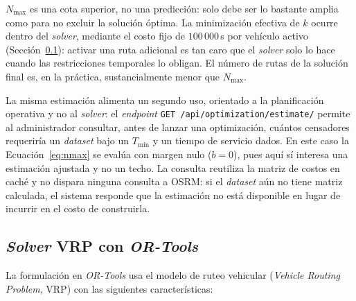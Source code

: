 $N_{\max}$ es una cota superior, no una
predicción: solo debe ser lo bastante amplia como para no excluir la solución óptima.
La minimización efectiva de $k$ ocurre dentro del \textit{solver}, mediante el costo fijo de
$100\,000$\,s por vehículo activo (Sección~\ref{sec:solver}): activar una ruta
adicional es tan caro que el \textit{solver} solo lo hace cuando las restricciones temporales
lo obligan. El número de rutas de la solución final es, en la práctica,
sustancialmente menor que $N_{\max}$.

La misma estimación alimenta un segundo uso, orientado a la planificación operativa
y no al \textit{solver}: el \textit{endpoint} \texttt{GET /api/optimization/estimate/} permite
al administrador consultar, antes de lanzar una optimización, cuántos censadores
requeriría un \textit{dataset} bajo un $T_{\min}$ y un tiempo de servicio dados. En
este caso la Ecuación~\ref{eq:nmax} se evalúa con margen nulo ($b=0$), pues aquí sí
interesa una estimación ajustada y no un techo. La consulta reutiliza la matriz de
costos en caché y no dispara ninguna consulta a OSRM: si el \textit{dataset} aún no
tiene matriz calculada, el sistema responde que la estimación no está disponible en
lugar de incurrir en el costo de construirla.

\subsection{\textit{Solver} VRP con \textit{OR-Tools}}
\label{sec:solver}

La formulación en \textit{OR-Tools} usa el modelo de ruteo vehicular (\textit{Vehicle Routing
Problem}, VRP) con las siguientes características:

